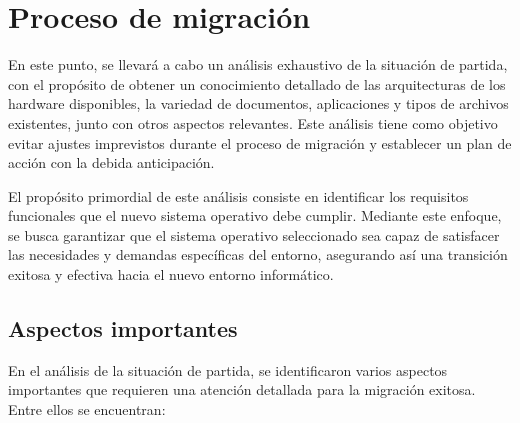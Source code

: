 \chapter{Proceso de migración}\label{ch:migración}

En este punto, se llevará a cabo un análisis exhaustivo de la situación de partida, con el propósito de obtener un conocimiento detallado de las arquitecturas de los hardware disponibles, la variedad de documentos, aplicaciones y tipos de archivos existentes, junto con otros aspectos relevantes. Este análisis tiene como objetivo evitar ajustes imprevistos durante el proceso de migración y establecer un plan de acción con la debida anticipación.

El propósito primordial de este análisis consiste en identificar los requisitos funcionales que el nuevo sistema operativo debe cumplir. Mediante este enfoque, se busca garantizar que el sistema operativo seleccionado sea capaz de satisfacer las necesidades y demandas específicas del entorno, asegurando así una transición exitosa y efectiva hacia el nuevo entorno informático.
	
	\section{Aspectos importantes}
					
		En el análisis de la situación de partida, se identificaron varios aspectos importantes que requieren una atención detallada para la migración exitosa. Entre ellos se encuentran:
		
